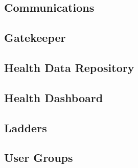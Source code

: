     \subsection{Communications}

    \subsection{Gatekeeper}

    \subsection{Health Data Repository}

    \subsection{Health Dashboard}

    \subsection{Ladders}

    \subsection{User Groups}
